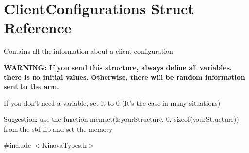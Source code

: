 \hypertarget{struct_client_configurations}{\section{Client\-Configurations Struct Reference}
\label{struct_client_configurations}
}


\par
Contains all the information about a client configuration \par
{\bfseries W\-A\-R\-N\-I\-N\-G\-: If you send this structure, always define all variables, there is no initial values. Otherwise, there will be random information sent to the arm.} \par
If you don't need a variable, set it to 0 (It's the case in many situations) \par
Suggestion\-: use the function memset(\&your\-Structure, 0, sizeof(your\-Structure)) from the std lib and set the memory  




{\ttfamily \#include $<$Kinova\-Types.\-h$>$}

